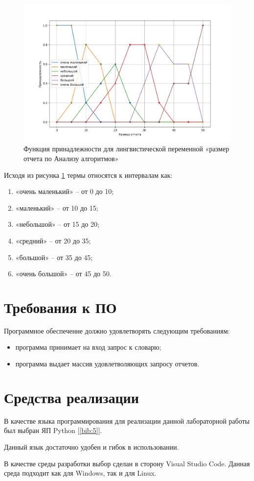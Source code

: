 \begin{figure}[!h]
            \includegraphics[scale=0.7]{img/graph.png}
            \caption{Функция принадлежности для лингвистической переменной «размер отчета по Анализу алгоритмов»}
            \label{graph:func:1}
        \end{figure}
        \newpage
    \par Исходя из рисунка \ref{graph:func:1} термы относятся к интервалам как:
    \begin{enumerate}
        \item «очень маленький» -- от 0 до 10;
        \item «маленький» -- от 10 до 15;
        \item «небольшой» -- от 15 до 20;
        \item «средний» -- от 20 до 35;
        \item «большой» -- от 35 до 45;
        \item «очень большой» -- от 45 до 50.
    \end{enumerate}

    \section{Требования к ПО}
        Программное обеспечение должно удовлетворять следующим требованиям:
        \begin{itemize}
            \item программа принимает на вход запрос к словарю;
            \item программа выдает массив удовлетволяющих запросу отчетов.
        \end{itemize}
    \section{Средства реализации}
        В качестве языка программирования для реализации данной лабораторной работы был выбран ЯП Python [\ref{bib:5}].
        \par Данный язык достаточно удобен и гибок в использовании.
        \par В качестве среды разработки выбор сделан в сторону Visual Studio Code. Данная среда подходит как для Windows, так и для Linux.

